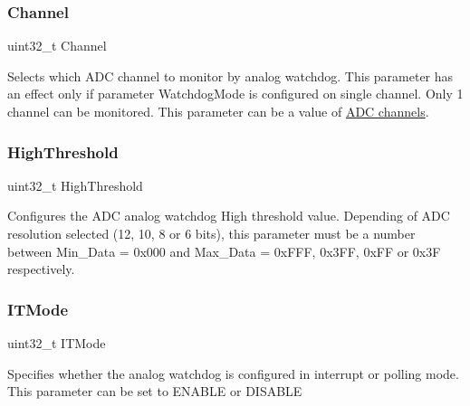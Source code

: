 \subsubsection{\texorpdfstring{Channel}{Channel}}
{\footnotesize\ttfamily uint32\+\_\+t Channel}

Selects which A\+DC channel to monitor by analog watchdog. This parameter has an effect only if parameter \textquotesingle{}Watchdog\+Mode\textquotesingle{} is configured on single channel. Only 1 channel can be monitored. This parameter can be a value of \hyperlink{group___a_d_c__channels}{A\+DC channels}. \mbox{\label{struct_a_d_c___analog_w_d_g_conf_type_def_a5c3a76d9a8ac84c537e7df10b0315e5a}} 
\subsubsection{\texorpdfstring{High\+Threshold}{HighThreshold}}
{\footnotesize\ttfamily uint32\+\_\+t High\+Threshold}

Configures the A\+DC analog watchdog High threshold value. Depending of A\+DC resolution selected (12, 10, 8 or 6 bits), this parameter must be a number between Min\+\_\+\+Data = 0x000 and Max\+\_\+\+Data = 0x\+F\+FF, 0x3\+FF, 0x\+FF or 0x3F respectively. \mbox{\label{struct_a_d_c___analog_w_d_g_conf_type_def_adb9d0be5088ff9f6e0b5e4bbb9088904}} 
\subsubsection{\texorpdfstring{I\+T\+Mode}{ITMode}}
{\footnotesize\ttfamily uint32\+\_\+t I\+T\+Mode}

Specifies whether the analog watchdog is configured in interrupt or polling mode. This parameter can be set to E\+N\+A\+B\+LE or D\+I\+S\+A\+B\+LE \mbox{\label{struct_a_d_c___analog_w_d_g_conf_type_def_a018c772cad96f1f0493ec0019ecc08f9}} 
